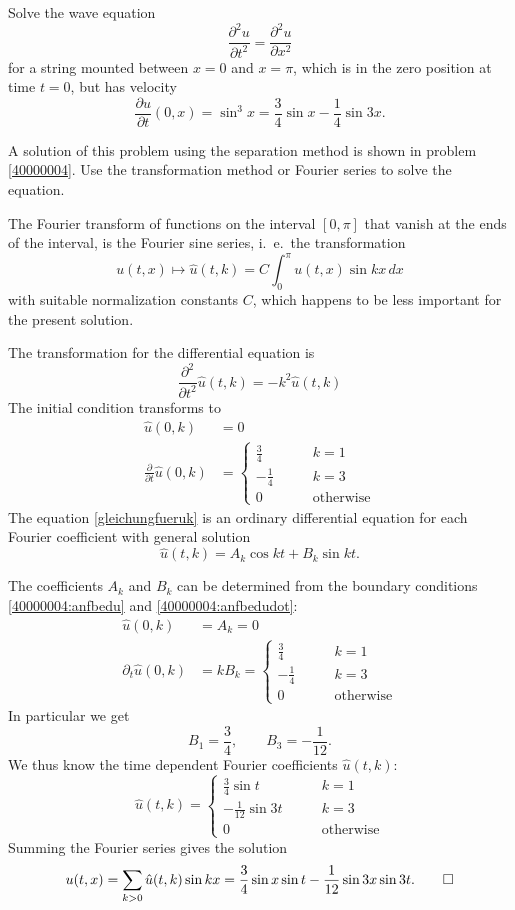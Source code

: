 Solve the wave equation
\[
\frac{\partial^2 u}{\partial t^2}=\frac{\partial^2 u}{\partial x^2}
\]
for a string mounted between $x=0$ and $x=\pi$,
which is in the zero position at time $t=0$, but has velocity
\[
\frac{\partial u}{\partial t}(0, x)
=
\sin^3 x=\frac34\sin x-\frac14\sin 3x.
\]

\begin{hinweis}
A solution of this problem using the separation method is shown in 
problem \ref{40000004}.
Use the transformation method or Fourier series to solve the equation.
\end{hinweis}

\begin{loesung}
The Fourier transform of functions on the interval $[0,\pi]$ that vanish
at the ends of the interval, is the Fourier sine series, i.~e.~the
transformation
\[
u(t,x) \mapsto \hat u(t, k)= C\int_0^{\pi} u(t,x)\sin kx\, dx
\]
with suitable normalization constants $C$, which happens to be less important
for the present solution.

The transformation for the differential equation is
\begin{equation}
\frac{\partial^2}{\partial t^2}\hat u(t,k)
=-k^2\hat u(t,k)
\label{gleichungfueruk}
\end{equation}
The initial condition transforms to
\begin{align}
\hat u(0,k)&=0\label{40000004:anfbedu}\\
\frac{\partial}{\partial t}\hat u(0,k)&=
\begin{cases}
\frac34&\qquad k= 1\\
-\frac14&\qquad k= 3\\
0&\qquad \text{otherwise}
\end{cases}
\label{40000004:anfbedudot}
\end{align}
The equation
\eqref{gleichungfueruk}
is an ordinary differential equation for each Fourier coefficient
with general solution
\[
\hat u(t,k)=A_k\cos kt+B_k\sin kt.
\]

The coefficients $A_k$ and $B_k$ can be determined from the boundary
conditions \eqref{40000004:anfbedu} and \eqref{40000004:anfbedudot}:
\begin{align*}
\hat u(0,k)&=A_k=0\\
\partial_t \hat u(0,k)&=kB_k=
\begin{cases}
\frac34&\qquad k= 1\\
-\frac14&\qquad k= 3\\
0&\qquad \text{otherwise}
\end{cases}
\end{align*}
In particular we get
\[
B_1=\frac34,\qquad B_3=-\frac1{12}.
\]
We thus know the time dependent Fourier coefficients $\hat u(t,k)$:
\[
\hat u(t,k)=
\begin{cases}
\frac34\sin t &\qquad k= 1\\
-\frac1{12}\sin 3t&\qquad k= 3\\
0&\qquad \text{otherwise}
\end{cases}
\]
Summing the Fourier series gives the solution
\[
u(t,x)=\sum_{k>0}\hat u(t,k) \sin kx
= \frac34\sin x \sin t -\frac1{12}\sin 3x \sin 3t.
\qedhere
\]
\end{loesung}
 

